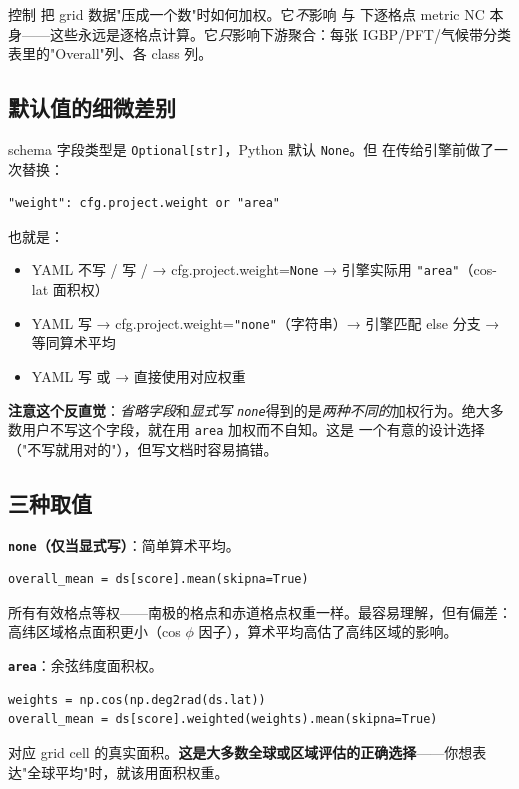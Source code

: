  控制 \openbench{} 把 grid 数据"压成一个数"时如何加权。它\emph{不}影响  与  下逐格点 metric NC 本身——这些永远是逐格点计算。它\emph{只}影响下游聚合：每张 IGBP/PFT/气候带分类表里的"Overall"列、各 class 列。

\subsection{默认值的细微差别}

schema 字段类型是 \texttt{Optional[str]}，Python 默认 \texttt{None}。但  在传给引擎前做了一次替换：

\begin{verbatim}
"weight": cfg.project.weight or "area"
\end{verbatim}

也就是：

\begin{itemize}
  \item YAML 不写 / 写  /  → cfg.project.weight=\texttt{None} → 引擎实际用 \texttt{"area"}（cos-lat 面积权）
  \item YAML 写  → cfg.project.weight=\texttt{"none"}（字符串）→ 引擎匹配 else 分支 → 等同算术平均
  \item YAML 写  或  → 直接使用对应权重
\end{itemize}

\textbf{注意这个反直觉}：\emph{省略字段}和\emph{显式写 \texttt{none}}得到的是\emph{两种不同的}加权行为。绝大多数用户不写这个字段，就在用 \texttt{area} 加权而不自知。这是 \openbench{} 一个有意的设计选择（"不写就用对的"），但写文档时容易搞错。

\subsection{三种取值}

\textbf{\texttt{none}（仅当显式写）}：简单算术平均。
\begin{verbatim}
overall_mean = ds[score].mean(skipna=True)
\end{verbatim}
所有有效格点等权——南极的格点和赤道格点权重一样。最容易理解，但有偏差：高纬区域格点面积更小（cos $\phi$ 因子），算术平均高估了高纬区域的影响。

\textbf{\texttt{area}}：余弦纬度面积权。
\begin{verbatim}
weights = np.cos(np.deg2rad(ds.lat))
overall_mean = ds[score].weighted(weights).mean(skipna=True)
\end{verbatim}
对应 grid cell 的真实面积。\textbf{这是大多数全球或区域评估的正确选择}——你想表达"全球平均"时，就该用面积权重。

